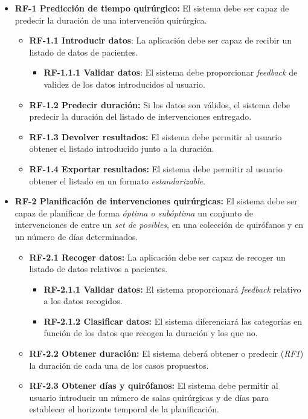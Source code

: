 \begin{itemize}
    \item \textbf{RF-1 Predicción de tiempo quirúrgico:} El sistema debe ser capaz de predecir la duración de una intervención quirúrgica.
    \begin{itemize}
        \item \textbf{RF-1.1 Introducir datos}: La aplicación debe ser capaz de recibir un listado de datos de pacientes.
        \begin{itemize}
            \item \textbf{RF-1.1.1 Validar datos}: El sistema debe proporcionar \textit{feedback} de validez de los datos introducidos al usuario.
\end{itemize}
\item \textbf{RF-1.2 Predecir duración:} Si los datos son válidos, el sistema debe predecir la duración del listado de intervenciones entregado.
\item \textbf{RF-1.3 Devolver resultados:} El sistema debe permitir al usuario obtener el listado introducido junto a la duración.
\item \textbf{RF-1.4 Exportar resultados:} El sistema debe permitir al usuario obtener el listado en un formato \textit{estandarizable}.
    \end{itemize}
    \item \textbf{RF-2 Planificación de intervenciones quirúrgicas:} El sistema debe ser capaz de planificar de forma \textit{óptima o subóptima} un conjunto de intervenciones de entre un \textit{set de posibles}, en una colección de quirófanos y en un número de días determinados.
    \begin{itemize}
        \item \textbf{RF-2.1 Recoger datos:} La aplicación debe ser capaz de recoger un listado de datos relativos a pacientes.
        \begin{itemize}
            \item \textbf{RF-2.1.1 Validar datos:} El sistema proporcionará \textit{feedback} relativo a los datos recogidos.
            \item \textbf{RF-2.1.2 Clasificar datos:} El sistema diferenciará las categorías en función de los datos que recogen la duración y los que no.
        \end{itemize}
        \item \textbf{RF-2.2 Obtener duración:} El sistema deberá obtener o predecir (\textit{RF1}) la duración de cada una de los casos propuestos.
        \item \textbf{RF-2.3 Obtener días y quirófanos:} El sistema debe permitir al usuario introducir un número de salas quirúrgicas y de días para establecer el horizonte temporal de la planificación.

\end{itemize}
\end{itemize}
